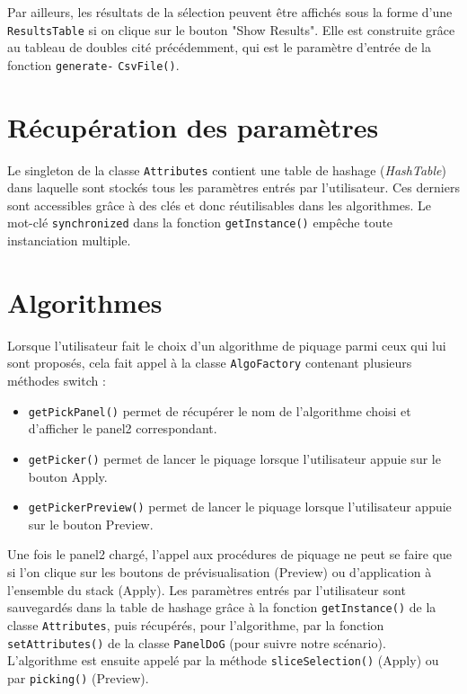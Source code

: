 Par ailleurs, les résultats de la sélection peuvent être affichés sous la forme d'une \texttt{ResultsTable} si on clique sur le bouton "Show Results". Elle est construite grâce au tableau de doubles cité précédemment, qui est le paramètre d'entrée de la fonction \texttt{generate-} \texttt{CsvFile()}. 

\section{Récupération des paramètres}

Le singleton de la classe \texttt{Attributes} contient une table de hashage (\emph{HashTable}) dans laquelle sont stockés tous les paramètres entrés par l'utilisateur. Ces derniers sont accessibles grâce à des clés et donc réutilisables dans les algorithmes. Le mot-clé  \texttt{synchronized} dans la fonction \texttt{getInstance()} empêche toute instanciation multiple. 

\section{Algorithmes}

Lorsque l'utilisateur fait le choix d'un algorithme de piquage parmi ceux qui lui sont proposés, cela fait appel à la classe \texttt{AlgoFactory} contenant plusieurs méthodes switch :
\begin{itemize}
\item \texttt{getPickPanel()} permet de récupérer le nom de l'algorithme choisi et d'afficher le panel2 correspondant.
\item \texttt{getPicker()} permet de lancer le piquage lorsque l'utilisateur appuie sur le bouton Apply.
\item \texttt{getPickerPreview()} permet de lancer le piquage lorsque l'utilisateur appuie sur le bouton Preview.
\end{itemize}

Une fois le panel2 chargé, l'appel aux procédures de piquage ne peut se faire que si l'on clique sur les boutons de prévisualisation (Preview) ou d'application à l'ensemble du stack (Apply). Les paramètres entrés par l'utilisateur sont sauvegardés dans la table de hashage grâce à la fonction \texttt{getInstance()} de la classe \texttt{Attributes}, puis récupérés, pour l'algorithme, par la fonction \texttt{setAttributes()} de la classe \texttt{PanelDoG} (pour suivre notre scénario). L'algorithme est ensuite appelé par la méthode \texttt{sliceSelection()} (Apply) ou par \texttt{picking()} (Preview). \\

